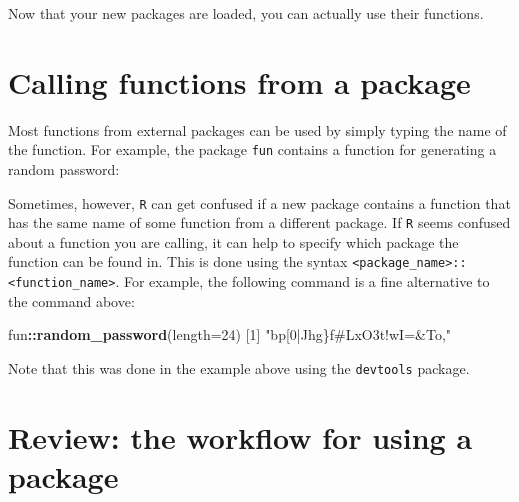 \documentclass[
]{book}
\newenvironment{Shaded}{\begin{snugshade}}{\end{snugshade}}
\newcommand{\CharTok}[1]{\textcolor[rgb]{0.31,0.60,0.02}{#1}}
\newcommand{\DataTypeTok}[1]{\textcolor[rgb]{0.13,0.29,0.53}{#1}}
\newcommand{\DecValTok}[1]{\textcolor[rgb]{0.00,0.00,0.81}{#1}}
\newcommand{\KeywordTok}[1]{\textcolor[rgb]{0.13,0.29,0.53}{\textbf{#1}}}
\newcommand{\NormalTok}[1]{#1}
\newcommand{\OperatorTok}[1]{\textcolor[rgb]{0.81,0.36,0.00}{\textbf{#1}}}
\newcommand{\StringTok}[1]{\textcolor[rgb]{0.31,0.60,0.02}{#1}}
\begin{document}
Now that your new packages are loaded, you can actually use their functions.

\hypertarget{calling-functions-from-a-package}{%
\section*{Calling functions from a package}\label{calling-functions-from-a-package}}

Most functions from external packages can be used by simply typing the name of the function. For example, the package \texttt{fun} contains a function for generating a random password:

\begin{Shaded}
\end{Shaded}

Sometimes, however, \texttt{R} can get confused if a new package contains a function that has the same name of some function from a different package. If \texttt{R} seems confused about a function you are calling, it can help to specify which package the function can be found in. This is done using the syntax \texttt{\textless{}package\_name\textgreater{}::\textless{}function\_name\textgreater{}}. For example, the following command is a fine alternative to the command above:

\begin{Shaded}
\begin{Highlighting}[]
\NormalTok{fun}\OperatorTok{::}\KeywordTok{random_password}\NormalTok{(}\DataTypeTok{length=}\DecValTok{24}\NormalTok{)}
\NormalTok{[}\DecValTok{1}\NormalTok{] }\StringTok{"bp[0|Jhg\}f#LxO3t!wI=&To,"}
\end{Highlighting}
\end{Shaded}

Note that this was done in the example above using the \texttt{devtools} package.

\hypertarget{review-the-workflow-for-using-a-package}{%
\section*{Review: the workflow for using a package}\label{review-the-workflow-for-using-a-package}}
\end{document}
